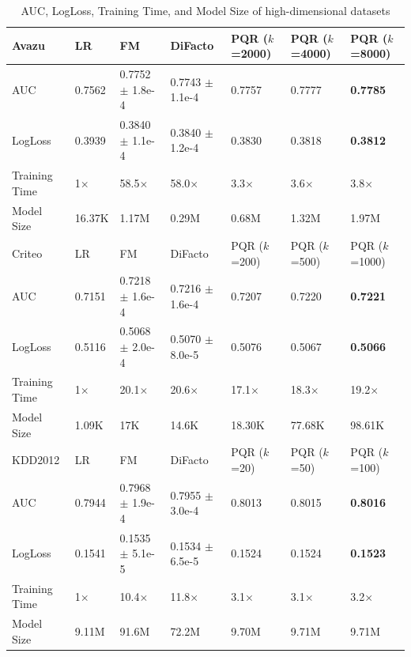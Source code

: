 \documentclass[letterpaper]{article} %
\theoremstyle{plain}
\theoremstyle{definition}
\begin{document}
\begin{table}
\caption{AUC, LogLoss, Training Time, and Model Size of high-dimensional datasets}
\label{auc_sparse}
\centering
\begin{tabular}{lllllll}
\toprule
Avazu         & LR        & FM                  & DiFacto             & PQR ($k$=2000)    & PQR ($k$=4000)    & PQR ($k$=8000)    \\
\midrule
AUC           & 0.7562    & 0.7752 $\pm$ 1.8e-4 & 0.7743 $\pm$ 1.1e-4 & 0.7757        & 0.7777        & \textbf{0.7785}        \\
LogLoss       & 0.3939    & 0.3840 $\pm$ 1.1e-4 & 0.3840 $\pm$ 1.2e-4 & 0.3830        & 0.3818        & \textbf{0.3812}        \\
Training Time & 1$\times$ & 58.5$\times$      & 58.0$\times$          & 3.3$\times$  & 3.6$\times$  & 3.8$\times$  \\
Model Size    & 16.37K    & 1.17M               &  0.29M              & 0.68M          &  1.32M        & 1.97M         \\
\midrule
Criteo        & LR        & FM                  & DiFacto             & PQR ($k$=200) & PQR ($k$=500)     & PQR ($k$=1000)  \\
\midrule
AUC           & 0.7151    & 0.7218 $\pm$ 1.6e-4 & 0.7216 $\pm$ 1.6e-4 & 0.7207        & 0.7220        & \textbf{0.7221}   \\
LogLoss       & 0.5116    & 0.5068 $\pm$ 2.0e-4 & 0.5070 $\pm$ 8.0e-5 & 0.5076        & 0.5067        & \textbf{0.5066}   \\
Training Time & 1$\times$ & 20.1$\times$        & 20.6$\times$       & 17.1$\times$ & 18.3$\times$ & 19.2$\times$  \\
Model Size    & 1.09K     & 17K                 & 14.6K               & 18.30K        & 77.68K        & 98.61K  \\
\midrule
KDD2012       & LR        & FM                  & DiFacto             & PQR ($k$=20)      & PQR ($k$=50)      & PQR ($k$=100)     \\
\midrule
AUC           & 0.7944    & 0.7968 $\pm$ 1.9e-4 & 0.7955 $\pm$ 3.0e-4 & 0.8013        & 0.8015        & \textbf{0.8016}        \\
LogLoss       & 0.1541    & 0.1535 $\pm$ 5.1e-5 & 0.1534 $\pm$ 6.5e-5 & 0.1524        & 0.1524        & \textbf{0.1523}        \\
Training Time & 1$\times$ & 10.4$\times$        & 11.8$\times$        & 3.1$\times$  & 3.1$\times$ & 3.2$\times$   \\
Model Size    & 9.11M     & 91.6M              & 72.2M                & 9.70M         & 9.71M         & 9.71M         \\
\bottomrule
\end{tabular}
\end{table}
\end{document}
